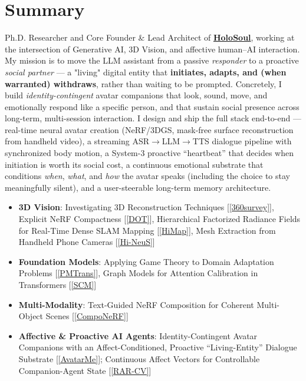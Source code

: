 \documentclass[letterpaper,10.8pt]{article}
\newcommand{\resumeItem}[2]{
  \item\small{
    \textbf{#1}{: #2 \vspace{-2pt}}
  }
}
\newcommand{\resumeItemListStart}{\begin{itemize}}
\newcommand{\resumeItemListEnd}{\end{itemize}\vspace{-5pt}}
\begin{document}
\section{Summary}
Ph.D. Researcher and Core Founder \& Lead Architect of \href{https://holosoul.cn/}{\textbf{HoloSoul}}, working at the intersection of Generative AI, 3D Vision, and affective human--AI interaction. My mission is to move the LLM assistant from a passive \textit{responder} to a proactive \textit{social partner} --- a "living" digital entity that \textbf{initiates, adapts, and (when warranted) withdraws}, rather than waiting to be prompted. Concretely, I build \textit{identity-contingent} avatar companions that look, sound, move, and emotionally respond like a specific person, and that sustain social presence across long-term, multi-session interaction. I design and ship the full stack end-to-end --- real-time neural avatar creation (NeRF/3DGS, mask-free surface reconstruction from handheld video), a streaming ASR$\rightarrow$LLM$\rightarrow$TTS dialogue pipeline with synchronized body motion, a System-3 proactive ``heartbeat'' that decides when initiation is worth its social cost, a continuous emotional substrate that conditions \textit{when}, \textit{what}, and \textit{how} the avatar speaks (including the choice to stay meaningfully silent), and a user-steerable long-term memory architecture.

\resumeItemListStart
\resumeItem{3D Vision}
{Investigating 3D Reconstruction Techniques [\ref{360survey}],
Explicit NeRF Compactness [\ref{DOT}],
Hierarchical Factorized Radiance Fields for Real-Time Dense SLAM Mapping [\ref{HiMap}],
Mesh Extraction from Handheld Phone Cameras [\ref{Hi-NeuS}]}
\resumeItem{Foundation Models}
{Applying Game Theory to Domain Adaptation Problems [\ref{PMTrans}],
Graph Models for Attention Calibration in Transformers [\ref{SCM}]}
\resumeItem{Multi-Modality}
{Text-Guided NeRF Composition for Coherent Multi-Object Scenes [\ref{CompoNeRF}]}
\resumeItem{Affective \& Proactive AI Agents}
{Identity-Contingent Avatar Companions with an Affect-Conditioned, Proactive ``Living-Entity'' Dialogue Substrate [\ref{AvatarMe}]; Continuous Affect Vectors for Controllable Companion-Agent State [\ref{RAR-CV}]}
\resumeItemListEnd




\end{document}
